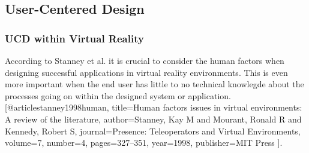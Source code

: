 \subsection{User-Centered Design}
\subsubsection{UCD within Virtual Reality}
According to Stanney et al. it is crucial to consider the human factors when designing successful applications in virtual reality environments. This is even more important when the end user has little to no technical knowlegde about the processes going on within the designed system or application.
[@article{stanney1998human,
  title={Human factors issues in virtual environments: A review of the literature},
  author={Stanney, Kay M and Mourant, Ronald R and Kennedy, Robert S},
  journal={Presence: Teleoperators and Virtual Environments},
  volume={7},
  number={4},
  pages={327--351},
  year={1998},
  publisher={MIT Press}
}].

